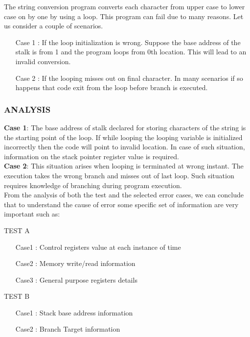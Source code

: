 \vspace{1.5cm}

The string conversion program converts each character from upper case to lower case on by one by using a loop. This program can fail due to many reasons. Let us consider a couple of scenarios.

\begin{itemize}

\item [Case 1]: If the loop initialization is wrong. Suppose the base address of the stalk is from 1 and the program loops from 0th location. This will lead to an invalid conversion.

\item [Case 2]: If the looping misses out on final character. In many scenarios if so happens that code exit from the loop before branch is executed.
\end{itemize}
\subsubsection{ANALYSIS}

{\bf Case 1}: The base address of stalk declared for storing characters of the string is the starting point of the loop. If while looping the looping variable is initialized incorrectly then the code will point to invalid location.  In case of such situation, information on the stack pointer register value is required. \\
{\bf Case 2}:  This situation arises when looping is terminated at wrong instant. The execution takes the wrong branch and misses out of last loop. Such situation requires knowledge of branching during program execution.\\



From the analysis of both the test and the selected error cases, we can conclude that to understand the cause of error some specific set of information are very important such as:

TEST A 
	\begin{itemize}
	\item [Case1]:  Control registers value at each instance of time
	\item [Case2]:  Memory write/read information
	\item [Case3]:  General purpose registers details
	\end{itemize}
TEST B 
	\begin{itemize}
	\item [Case1]: Stack base address information
	\item [Case2]: Branch Target information
	\end{itemize}

